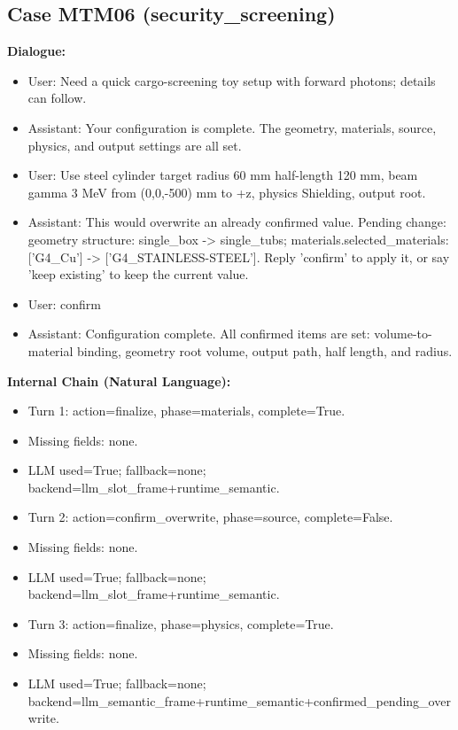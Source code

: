 \documentclass[11pt]{ctexart}
\begin{document}
\subsection{Case MTM06 (security\_screening)}
\textbf{Dialogue:}
\begin{itemize}
\item User: Need a quick cargo-screening toy setup with forward photons; details can follow.
\item Assistant: Your configuration is complete. The geometry, materials, source, physics, and output settings are all set.
\item User: Use steel cylinder target radius 60 mm half-length 120 mm, beam gamma 3 MeV from (0,0,-500) mm to +z, physics Shielding, output root.
\item Assistant: This would overwrite an already confirmed value. Pending change: geometry structure: single\_box -> single\_tubs; materials.selected\_materials: ['G4\_Cu'] -> ['G4\_STAINLESS-STEEL']. Reply 'confirm' to apply it, or say 'keep existing' to keep the current value.
\item User: confirm
\item Assistant: Configuration complete. All confirmed items are set: volume-to-material binding, geometry root volume, output path, half length, and radius.
\end{itemize}
\textbf{Internal Chain (Natural Language):}
\begin{itemize}
\item Turn 1: action=finalize, phase=materials, complete=True.
\item Missing fields: none.
\item LLM used=True; fallback=none; backend=llm\_slot\_frame+runtime\_semantic.
\item Turn 2: action=confirm\_overwrite, phase=source, complete=False.
\item Missing fields: none.
\item LLM used=True; fallback=none; backend=llm\_slot\_frame+runtime\_semantic.
\item Turn 3: action=finalize, phase=physics, complete=True.
\item Missing fields: none.
\item LLM used=True; fallback=none; backend=llm\_semantic\_frame+runtime\_semantic+confirmed\_pending\_overwrite.
\end{itemize}
\end{document}
